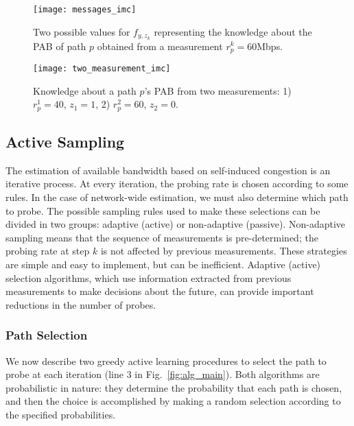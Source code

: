 \documentclass[final,5p,times,twocolumn]{elsarticle}
\begin{document}
\begin{figure}[!h]
\centering
\texttt{[image: messages\_imc]}
\caption{Two possible values for $f_{y,z_k}$ representing the knowledge about the PAB of path $p$ obtained from a measurement $r_p^k = 60$Mbps.\label{fig:measurement_msg_imc}}
\end{figure}

\begin{figure}[!h]
\centering
\texttt{[image: two\_measurement\_imc]}
\caption{Knowledge about a path $p$'s PAB from two measurements: 1) $r_p^1 = 40$, $z_1 = 1$, 2) $r_p^2 = 60$, $z_2 = 0$.\label{fig:two_measurements_imc}}
\end{figure}


\subsection{Active Sampling}

The estimation of available bandwidth based on self-induced congestion is an iterative process.  At every iteration, the probing rate is chosen according to some rules.  In the case of network-wide estimation, we must also determine which path to probe.  The possible sampling rules used to make these selections can be divided in two groups: adaptive (active) or non-adaptive (passive).  Non-adaptive sampling means that the sequence of measurements is pre-determined; the probing rate at step $k$ is not affected by previous measurements.  These strategies are simple and easy to implement, but can be inefficient.  Adaptive (active) selection algorithms, which use information extracted from previous measurements to make decisions about the future, can provide important reductions in the number of probes.  

\subsubsection{Path Selection}

We now describe two greedy active learning procedures to select the path to probe at each iteration (line 3 in Fig.~\ref{fig:alg_main}). Both algorithms are probabilistic in nature: they determine the probability that each path is chosen, and then the choice is accomplished by making a random selection according to the specified probabilities.
\end{document}
